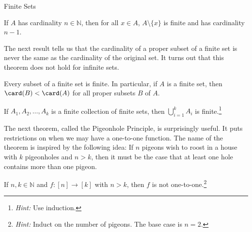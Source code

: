 \begin{section}{Finite Sets}
\begin{theorem}\label{thm:decreaseCardinality}
If $A$ has cardinality $n\in\mathbb{N}$, then for all $x\in A$, $A\setminus \{x\}$ is finite and has cardinality $n-1$. 
\end{theorem}

The next result tells us that the cardinality of a proper subset of a finite set is never the same as the cardinality of the original set.  It turns out that this theorem does not hold for infinite sets. 

\begin{theorem}\label{thm:cardinalityProperSubsetsFinite}
Every subset of a finite set is finite. In particular, if $A$ is a finite set, then $\card(B)<\card(A)$ for all proper subsets $B$ of $A$.
\end{theorem}

\begin{theorem}
If $A_1,A_2,\ldots, A_k$ is a finite collection of finite sets, then $\displaystyle \bigcup_{i=1}^k A_i$ is finite.\footnote{\emph{Hint:} Use induction.}
\end{theorem}

The next theorem, called the Pigeonhole Principle, is surprisingly useful. It puts restrictions on when we may have a one-to-one function. The name of the theorem is inspired by the following idea: If $n$ pigeons wish to roost in a house with $k$ pigeonholes and $n>k$, then it must be the case that at least one hole contains more than one pigeon.

\begin{theorem}
If $n,k\in\mathbb{N}$ and $f:[n]\to [k]$ with $n>k$, then $f$ is not one-to-one.\footnote{\emph{Hint:} Induct on the number of pigeons. The base case is $n=2$.}
\end{theorem}

\end{section}